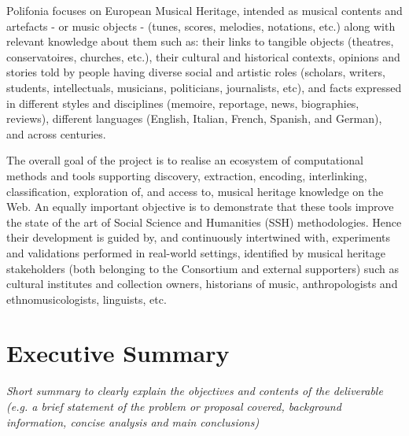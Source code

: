 Polifonia focuses on European Musical Heritage, intended as musical contents and artefacts - or music objects - (tunes, scores, melodies, notations, etc.) along with relevant knowledge about them such as: their links to tangible objects (theatres, conservatoires, churches, etc.), their cultural and historical contexts, opinions and stories told by people having diverse social and artistic roles (scholars, writers, students, intellectuals, musicians, politicians, journalists, etc), and facts expressed in different styles and disciplines (memoire, reportage, news, biographies, reviews), different languages (English, Italian, French, Spanish, and German), and across centuries.

The overall goal of the project is to realise an ecosystem of computational methods and tools supporting discovery, extraction, encoding, interlinking, classification, exploration of, and access to, musical heritage knowledge on the Web. An equally important objective is to demonstrate that these tools improve the state of the art of Social Science and Humanities (SSH) methodologies. Hence their development is guided by, and continuously intertwined with, experiments and validations performed in real-world settings, identified by musical heritage stakeholders (both belonging to the Consortium and external supporters) such as cultural institutes and collection owners, historians of music, anthropologists and ethnomusicologists, linguists, etc.

\clearpage

\pagestyle{empty}


\section*{Executive Summary}

\textit{Short summary to clearly explain the objectives and contents of the deliverable (e.g. a brief statement of the problem or proposal covered, background information, concise analysis and main conclusions)}

\clearpage

\pagestyle{empty}


